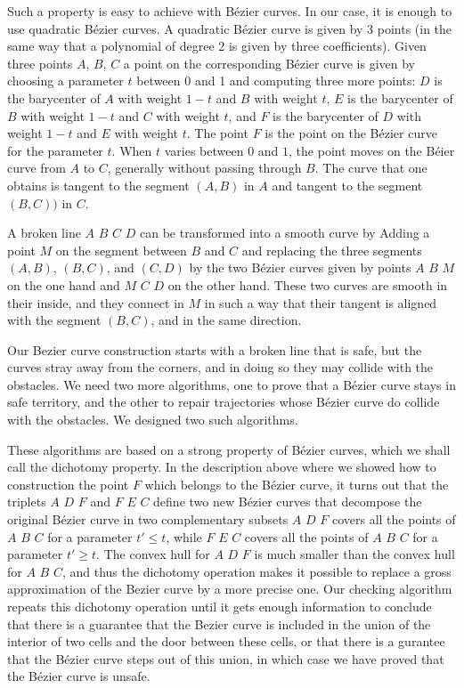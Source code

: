 \documentclass{easychair}
\begin{document}
Such a property is easy to achieve with Bézier curves.  In our case,
it is enough to use quadratic Bézier curves.  A quadratic Bézier curve
is given by 3 points (in the same way that a polynomial of degree 2 is
given by three coefficients).  Given three points \(A\), \(B\), \(C\)
a point on the corresponding Bézier curve is given by choosing a
parameter \(t\) between 0 and 1 and computing three more points:
\(D\) is the barycenter of \(A\) with weight \(1 - t\) and \(B\) with
weight \(t\), \(E\) is the barycenter of \(B\) with weight \(1 - t\)
and \(C\) with weight \(t\), and \(F\) is the barycenter of \(D\) with
weight \(1-t\) and \(E\) with weight \(t\).  The point \(F\) is the
point on the Bézier curve for the parameter \(t\).  When \(t\) varies
between \(0\) and \(1\), the point moves on the Béier curve from \(A\)
to \(C\), generally without passing through \(B\).  The curve that one
obtains is tangent to the segment \((A,B)\) in \(A\) and tangent to
the segment \((B,C))\) in \(C\).

A broken line \(A\) \(B\) \(C\) \(D\) can be transformed into a smooth
curve by Adding a point \(M\) on the segment between \(B\) and \(C\)
and replacing the three segments \((A, B)\), \((B, C)\), and \((C,
D)\) by the two Bézier curves given by points \(A\) \(B\) \(M\) on the
one hand and \(M\) \(C\) \(D\) on the other hand.  These two curves
are smooth in their inside, and they connect in \(M\) in such a way
that their tangent is aligned with the segment \((B, C)\), and in the
same direction.

Our Bezier curve construction starts with a broken line that is safe,
but the curves stray away from the corners, and in doing so they may
collide with the obstacles.  We need two more algorithms, one to prove
that a Bézier curve stays in safe territory, and the other to repair
trajectories whose Bézier curve do collide with the obstacles.  We
designed two such algorithms.

These algorithms are based on a strong property of Bézier curves,
which we shall call the dichotomy property.  In the description above
where we showed how to construction the point \(F\) which belongs to
the Bézier curve, it turns out that the triplets \(A\) \(D\) \(F\) and
\(F\) \(E\) \(C\) define two new Bézier curves that decompose the
original Bézier curve in two complementary subsets \(A\) \(D\) \(F\)
covers all the points of \(A\) \(B\) \(C\) for a parameter \(t' \leq
t\), while \(F\) \(E\) \(C\) covers all the points of \(A\) \(B\)
\(C\) for a parameter \(t'\geq t\).  The convex hull for \(A\) \(D\)
\(F\) is much smaller than the convex hull for \(A\) \(B\) \(C\), and
thus the dichotomy operation makes it possible to replace a gross
approximation of the Bezier curve by a more precise one.  Our checking
algorithm repeats this dichotomy operation until it gets enough
information to conclude that there is a guarantee that the Bezier curve
is included in the union of the interior of two cells and the door
between these cells, or that there is a gurantee that the Bézier curve
steps out of this union, in which case we have proved that the Bézier
curve is unsafe.
\end{document}
